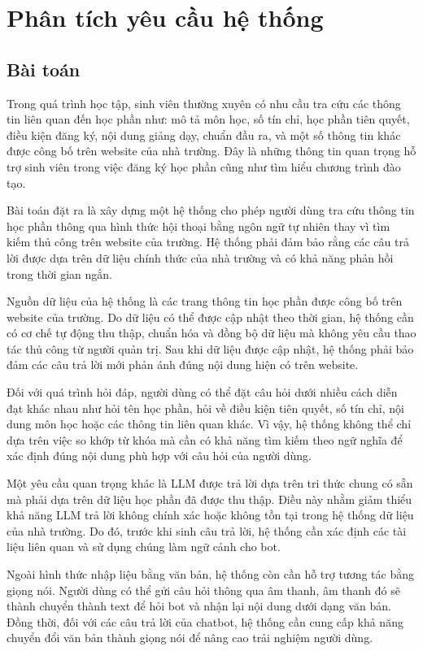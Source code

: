 \documentclass[../DoAn.tex]{subfiles}
\begin{document}
\section{Phân tích yêu cầu hệ thống}
\subsection{Bài toán}
Trong quá trình học tập, sinh viên thường xuyên có nhu cầu tra cứu các thông tin liên quan đến học phần như: mô tả môn học, số tín chỉ, học phần tiên quyết, điều kiện đăng ký, nội dung giảng dạy, chuẩn đầu ra, và một số thông tin khác được công bố trên website của nhà trường. Đây là những thông tin quan trọng hỗ trợ sinh viên trong việc đăng ký học phần cũng như tìm hiểu chương trình đào tạo.

Bài toán đặt ra là xây dựng một hệ thống cho phép người dùng tra cứu thông tin học phần thông qua hình thức hội thoại bằng ngôn ngữ tự nhiên thay vì tìm kiếm thủ công trên website của trường. Hệ thống phải đảm bảo rằng các câu trả lời được dựa trên dữ liệu chính thức của nhà trường và có khả năng phản hồi trong thời gian ngắn.

Nguồn dữ liệu của hệ thống là các trang thông tin học phần được công bố trên website của trường. Do dữ liệu có thể được cập nhật theo thời gian, hệ thống cần có cơ chế tự động thu thập, chuẩn hóa và đồng bộ dữ liệu mà không yêu cầu thao tác thủ công từ người quản trị. Sau khi dữ liệu được cập nhật, hệ thống phải bảo đảm các câu trả lời mới phản ánh đúng nội dung hiện có trên website.

Đối với quá trình hỏi đáp, người dùng có thể đặt câu hỏi dưới nhiều cách diễn đạt khác nhau như hỏi tên học phần, hỏi về điều kiện tiên quyết, số tín chỉ, nội dung môn học hoặc các thông tin liên quan khác. Vì vậy, hệ thống không thể chỉ dựa trên việc so khớp từ khóa mà cần có khả năng tìm kiếm theo ngữ nghĩa để xác định đúng nội dung phù hợp với câu hỏi của người dùng.

Một yêu cầu quan trọng khác là LLM được trả lời dựa trên tri thức chung có sẵn mà phải dựa trên dữ liệu học phần đã được thu thập. Điều này nhằm giảm thiểu khả năng LLM trả lời không chính xác hoặc không tồn tại trong hệ thống dữ liệu của nhà trường. Do đó, trước khi sinh câu trả lời, hệ thống cần xác định các tài liệu liên quan và sử dụng chúng làm ngữ cảnh cho bot.

Ngoài hình thức nhập liệu bằng văn bản, hệ thống còn cần hỗ trợ tương tác bằng giọng nói. Người dùng có thể gửi câu hỏi thông qua âm thanh, âm thanh đó sẽ thành chuyển thành text để hỏi bot và nhận lại nội dung dưới dạng văn bản. Đồng thời, đối với các câu trả lời của chatbot, hệ thống cần cung cấp khả năng chuyển đổi văn bản thành giọng nói để nâng cao trải nghiệm người dùng.
\end{document}
